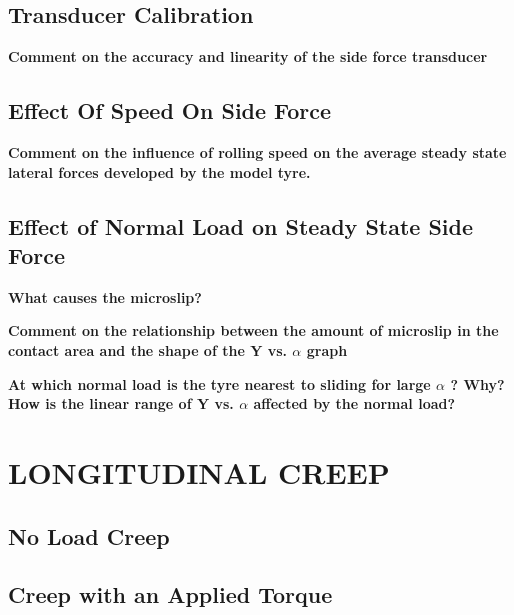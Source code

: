 \documentclass{article}
\begin{document}
\subsection{\textbf{Transducer Calibration}}

\begin{center}
    \textbf{Comment on the accuracy and linearity of the side force transducer}
\end{center}

\subsection{\textbf{Effect Of Speed On Side Force}}

\begin{center}
    \textbf{Comment on the influence of rolling speed on the average steady state lateral forces
    developed by the model tyre.}
\end{center}

\subsection{\textbf{Effect of Normal Load on Steady State Side Force}}

\begin{center}
    \textbf{What causes the microslip?}
\end{center}

\begin{center}
    \textbf{Comment on the relationship between the amount of microslip in the contact area and
    the shape of the Y vs. $ \alpha $ graph}
\end{center}

\begin{center}
    \textbf{At which normal load is the tyre nearest to sliding for large
    $ \alpha $ ? Why? How is the
    linear range of Y vs.
    $ \alpha $ affected by the normal load?}
\end{center}

\section{LONGITUDINAL CREEP}

\subsection{\textbf{No Load Creep}}

\subsection{\textbf{Creep with an Applied Torque}}
\end{document}
